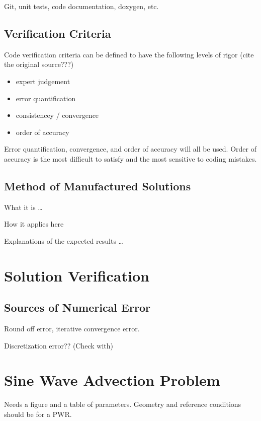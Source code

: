 \documentclass{mc2015}
\begin{document}
Git, unit tests, code documentation, doxygen, etc.

\subsection{Verification Criteria}

Code verification criteria can be defined to
have the following levels of rigor \cite{Roy:2005:RCS:1082892.1082899}
(cite the original source???)

\begin{itemize}
  \item expert judgement
  \item error quantification
  \item consistencey / convergence
  \item order of accuracy
\end{itemize}

Error quantification, convergence, and order of accuracy will all be used. Order
of accuracy is the most difficult to satisfy and the most sensitive to coding
mistakes.

\subsection{Method of Manufactured Solutions}

What it is \ldots

How it applies here

Explanations of the expected results \ldots

\section{Solution Verification}

\subsection{Sources of Numerical Error}

Round off error, iterative convergence error.

Discretization error?? (Check with)

\section{Sine Wave Advection Problem}

Needs a figure and a table of parameters. Geometry and reference conditions
should be for a PWR.
\end{document}
